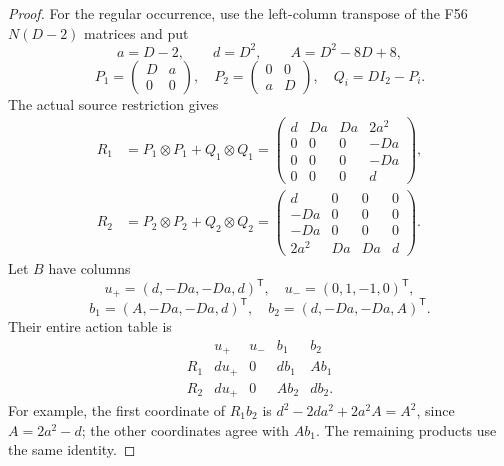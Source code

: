\documentclass[11pt,a4paper]{article}
\newcommand{\fid}[1]{\textsf{#1}}\newcommand{\gate}[1]{\textsf{#1}}
\theoremstyle{named}\newtheorem{finding}{Finding}[section]
\theoremstyle{definition}\newtheorem{definition}[finding]{Definition}
\theoremstyle{remark}\newtheorem{remark}[finding]{Remark}
\begin{document}
\begin{proof}
For the regular occurrence, use the left-column transpose
of the \fid{F56} \(N(D-2)\) matrices and put
\[
 a=D-2,\qquad d=D^2,\qquad A=D^2-8D+8,
\]
\[
 P_1=\begin{pmatrix}D&a\\0&0\end{pmatrix},\quad
 P_2=\begin{pmatrix}0&0\\a&D\end{pmatrix},\quad
 Q_i=DI_2-P_i.
\]
The actual source restriction gives
\begin{equation}\label{eq:iteratedFourDimensionalMatrices}
 \begin{split}
 R_1&=P_1\otimes P_1+Q_1\otimes Q_1
  =\begin{pmatrix}
     d&Da&Da&2a^2\\
     0&0&0&-Da\\
     0&0&0&-Da\\
     0&0&0&d
    \end{pmatrix},\\
 R_2&=P_2\otimes P_2+Q_2\otimes Q_2
  =\begin{pmatrix}
     d&0&0&0\\
     -Da&0&0&0\\
     -Da&0&0&0\\
     2a^2&Da&Da&d
    \end{pmatrix}.
 \end{split}
\end{equation}
Let \(B\) have columns
\[
 u_+=(d,-Da,-Da,d)^{\mathsf T},\quad
 u_-=(0,1,-1,0)^{\mathsf T},
\]
\[
 b_1=(A,-Da,-Da,d)^{\mathsf T},\quad
 b_2=(d,-Da,-Da,A)^{\mathsf T}.
\]
Their entire action table is
\[
\begin{array}{c|rrrr}
 &u_+&u_-&b_1&b_2\\ \hline
 R_1&d u_+&0&d b_1&A b_1\\
 R_2&d u_+&0&A b_2&d b_2 .
\end{array}
\]
For example, the first coordinate of \(R_1b_2\) is
\(d^2-2da^2+2a^2A=A^2\), since \(A=2a^2-d\);
the other coordinates agree with \(A b_1\).
The remaining products use the same identity.


\end{proof}
\end{document}
